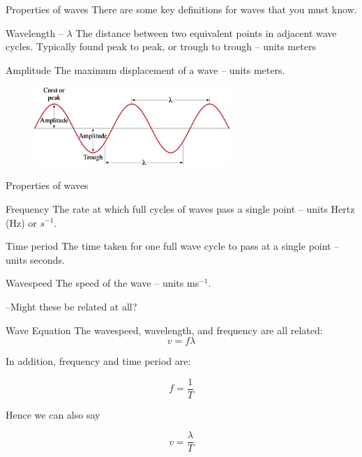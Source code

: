 \documentclass[../Main.tex]{subfiles}
\begin{document}
\begin{frame}{Properties of waves}
    There are some key definitions for waves that you must know.
    \begin{block}{Wavelength -- $\lambda$}
        The distance between two equivalent points in adjacent wave cycles. Typically found peak to peak, or trough to trough -- units meters
    \end{block}\pause 
    \begin{block}{Amplitude}
    The maximum displacement of a wave -- units meters.
    \end{block}
    \begin{figure}
        \centering
        \includegraphics[height=3cm]{Waves_Images/amplitude_wavelength.png}
    \end{figure}
\end{frame}

\begin{frame}{Properties of waves}
    \begin{block}{Frequency}
    The rate at which full cycles of waves pass a single point -- units Hertz (Hz) or $s^{-1}$.
    \end{block}\pause 
    \begin{block}{Time period}
    The time taken for one full wave cycle to pass at a single point -- units seconds.
    \end{block}\pause 
    \begin{block}{Wavespeed}
    The speed of the wave -- units ms$^{-1}$.
    \end{block} \pause 
    --Might these be related at all?
\end{frame}

\begin{frame}{Wave Equation}
    The wavespeed, wavelength, and frequency are all related:
    {\large \begin{equation*}
        v=f\lambda
    \end{equation*}} \pause
    
    In addition, frequency and time period are: 
    
    \begin{equation*}
        f=\frac{1}{T}
    \end{equation*} 
    
    Hence we can also say 
    
    \begin{equation*}
        v=\frac{\lambda}{T}
    \end{equation*}
\end{frame}
\end{document}
